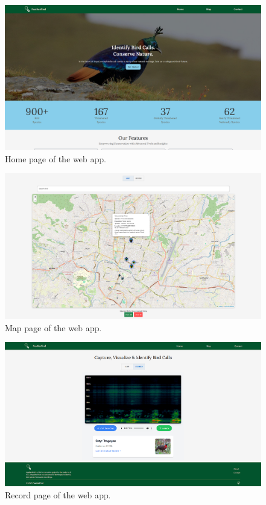 \begin{figure}[h!]
      \centering
      \includegraphics[scale=0.25]{images/web_homepage.png}
      \caption{Home page of the web app.}
  \end{figure}

  \begin{figure}[h!]
      \centering
      \includegraphics[scale=0.25]{images/web_mappage.png}
      \caption{Map page of the web app.}
  \end{figure}

  \begin{figure}[h!]
      \centering
      \includegraphics[scale=0.25]{images/web_recordpage.png}
      \caption{Record page of the web app.}
  \end{figure}




